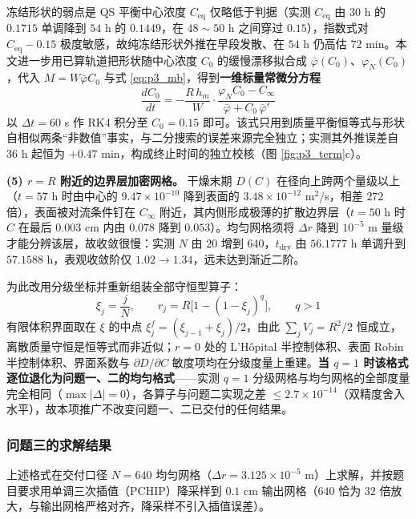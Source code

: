 冻结形状的弱点是 QS 平衡中心浓度 $C_{\text{eq}}$ 仅略低于判据（实测 $C_{\text{eq}}$ 由 $30$ h 的 $0.1715$ 单调降到 $54$ h 的 $0.1449$，在 $48\sim50$ h 之间穿过 $0.15$），指数式对 $C_{\text{eq}}-0.15$ 极度敏感，故纯冻结形状外推在早段发散、在 $54$ h 仍高估 $72$ min。本文进一步用已算轨道把形状随中心浓度 $C_0$ 的缓慢漂移拟合成 $\bar\varphi(C_0)$、$\varphi_N(C_0)$，代入 $M=W\bar\varphi C_0$ 与式 \eqref{eq:p3_mb}，得到\textbf{一维标量常微分方程}
\begin{equation}
  \frac{dC_0}{dt}=-\frac{R\,h_m}{W}\cdot\frac{\varphi_NC_0-C_\infty}{\bar\varphi+C_0\,\bar\varphi'}
  \label{eq:p3_qs1}
\end{equation}
以 $\Delta t=60$ s 作 RK4 积分至 $C_0=0.15$ 即可。该式只用到质量平衡恒等式与形状自相似两条“非数值”事实，与二分搜索的误差来源完全独立；实测其外推误差自 $36$ h 起恒为 $+0.47$ min，构成终止时间的独立校核（图 \ref{fig:p3_term}c）。

\textbf{(5) $r=R$ 附近的边界层加密网格。} 干燥末期 $D(C)$ 在径向上跨两个量级以上（$t=57$ h 时由中心的 $9.47\times10^{-10}$ 降到表面的 $3.48\times10^{-12}$ m$^2$/s，相差 $272$ 倍），表面被对流条件钉在 $C_\infty$ 附近，其内侧形成极薄的扩散边界层（$t=50$ h 时 $C$ 在最后 $0.003$ cm 内由 $0.078$ 降到 $0.053$）。均匀网格须将 $\Delta r$ 降到 $10^{-5}$ m 量级才能分辨该层，故收敛很慢：实测 $N$ 由 $20$ 增到 $640$，$t_{\text{dry}}$ 由 $56.1777$ h 单调升到 $57.1588$ h，表观收敛阶仅 $1.02\to1.34$，远未达到渐近二阶。

为此改用分级坐标并重新组装全部守恒型算子：
\begin{equation}
  \xi_j=\frac{j}{N},\qquad r_j=R\big[1-(1-\xi_j)^q\big],\qquad q>1
  \label{eq:p3_grid}
\end{equation}
有限体积界面取在 $\xi$ 的中点 $\xi^f_j=(\xi_{j-1}+\xi_j)/2$，由此 $\sum_jV_j=R^2/2$ 恒成立，离散质量守恒是恒等式而非近似；$r=0$ 处的 L'Hôpital 半控制体积、表面 Robin 半控制体积、界面系数与 $\partial D/\partial C$ 敏度项均在分级度量上重建。\textbf{当 $q=1$ 时该格式逐位退化为问题一、二的均匀格式}——实测 $q=1$ 分级网格与均匀网格的全部度量完全相同（$\max|\Delta|=0$），各算子与问题二实现之差 $\le2.7\times10^{-14}$（双精度舍入水平），故本项推广不改变问题一、二已交付的任何结果。

\subsubsection{问题三的求解结果}

上述格式在交付口径 $N=640$ 均匀网格（$\Delta r=3.125\times10^{-5}$ m）上求解，并按题目要求用单调三次插值（PCHIP）降采样到 $0.1$ cm 输出网格（$640$ 恰为 $32$ 倍放大，与输出网格严格对齐，降采样不引入插值误差）。

